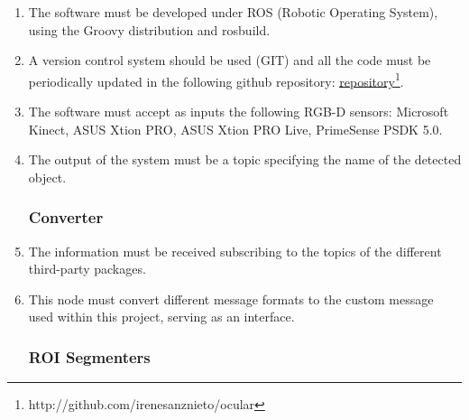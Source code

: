 \begin{enumerate}[label=\textbf{FR\threedigits*}, leftmargin=2cm]

	\item The software must be developed under ROS (Robotic Operating System), using the Groovy distribution and rosbuild.
	\item A version control system should be used (GIT) and all the code must be periodically updated in the following github repository: \href{http://github.com/irenesanznieto/ocular}{\color{blue}\underline {repository}}\footnote{http://github.com/irenesanznieto/ocular}. 

	\item The software must accept as inputs the following RGB-D sensors: Microsoft Kinect, ASUS Xtion PRO, ASUS Xtion PRO Live, PrimeSense PSDK 5.0.
	\item The output of the system must be a topic specifying the name of the detected object. 
 
 
\subsubsection{Converter} 

\item The information must be received subscribing to the topics of the different third-party packages. 
\item This node must convert different message formats to the custom message used within this project, serving as an interface. 


\subsubsection{ROI Segmenters}


\end{enumerate}
